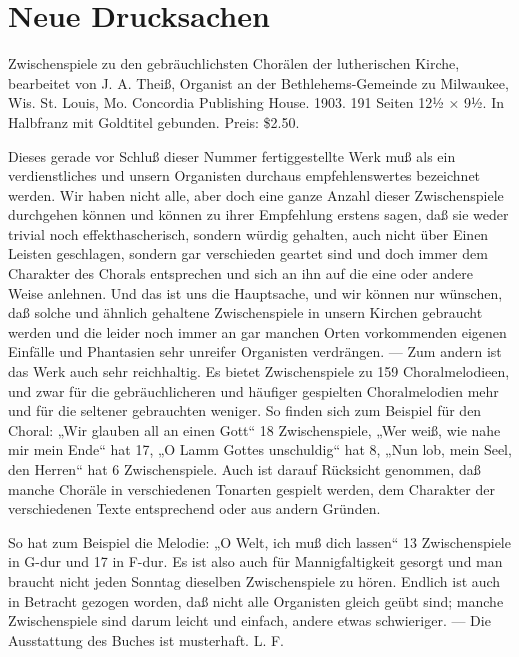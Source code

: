 \chapter[Neue Drucksachen]{Neue Drucksachen}
Zwischenspiele zu den gebräuchlichsten Chorälen der lutherischen Kirche, bearbeitet von J. A. Theiß, Organist an der Bethlehems-Gemeinde zu Milwaukee, Wis. St. Louis, Mo. Concordia Publishing House. 1903. 191 Seiten 12½ × 9½. In Halbfranz mit Goldtitel gebunden. Preis: \$2.50.

Dieses gerade vor Schluß dieser Nummer fertiggestellte Werk muß als ein verdienstliches und unsern Organisten durchaus empfehlenswertes bezeichnet werden. Wir haben nicht alle, aber doch eine ganze Anzahl dieser Zwischenspiele durchgehen können und können zu ihrer Empfehlung erstens sagen, daß sie weder trivial noch effekthascherisch, sondern würdig gehalten, auch nicht über Einen Leisten geschlagen, sondern gar verschieden geartet sind und doch immer dem Charakter des Chorals entsprechen und sich an ihn auf die eine oder andere Weise anlehnen. Und das ist uns die Hauptsache, und wir können nur wünschen, daß solche und ähnlich gehaltene Zwischenspiele in unsern Kirchen gebraucht werden und die leider noch immer an gar manchen Orten vorkommenden eigenen Einfälle und Phantasien sehr unreifer Organisten verdrängen. — Zum andern ist das Werk auch sehr reichhaltig. Es bietet Zwischenspiele zu 159 Choralmelodieen, und zwar für die gebräuchlicheren und häufiger gespielten Choralmelodien mehr und für die seltener gebrauchten weniger. So finden sich zum Beispiel für den Choral: „Wir glauben all an einen Gott“ 18 Zwischenspiele, „Wer weiß, wie nahe mir mein Ende“ hat 17, „O Lamm Gottes unschuldig“ hat 8, „Nun lob, mein Seel, den Herren“ hat 6 Zwischenspiele. Auch ist darauf Rücksicht genommen, daß manche Choräle in verschiedenen Tonarten gespielt werden, dem Charakter der verschiedenen Texte entsprechend oder aus andern Gründen.

So hat zum Beispiel die Melodie: „O Welt, ich muß dich lassen“ 13 Zwischenspiele in G-dur und 17 in F-dur. Es ist also auch für Mannigfaltigkeit gesorgt und man braucht nicht jeden Sonntag dieselben Zwischenspiele zu hören. Endlich ist auch in Betracht gezogen worden, daß nicht alle Organisten gleich geübt sind; manche Zwischenspiele sind darum leicht und einfach, andere etwas schwieriger. — Die Ausstattung des Buches ist musterhaft. L. F.
